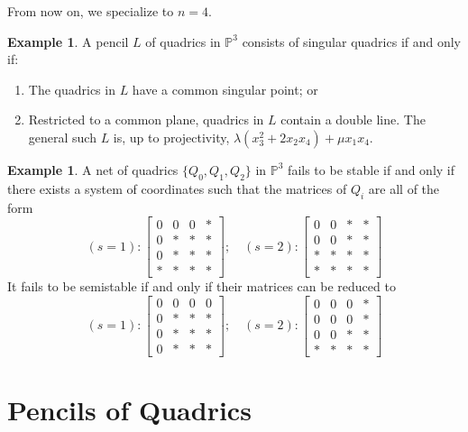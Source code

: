 \documentclass{amsart}[12pt]
\theoremstyle{definition}
\newtheorem{eg}[theorem]{Example}
\theoremstyle{remark}
\numberwithin{equation}{section}
\begin{document}
From now on, we specialize to $n = 4$. 

\begin{eg}
A pencil $L$ of quadrics in $\mathbb{P}^{3}$ consists of singular quadrics if and only if:
\begin{enumerate}
\item The quadrics in $L$ have a common singular point; or
\item Restricted to a common plane, quadrics in $L$ contain a double line. The general such $L$ is, up to projectivity, $\lambda (x_3^2 + 2x_2x_4) +  \mu x_1x_4$.
\end{enumerate}
\end{eg}


\begin{eg}
A net of quadrics $\{Q_0, Q_1, Q_2\}$ in $\mathbb{P}^3$ fails to be stable if and only if there exists a system of coordinates such that the matrices of $Q_i$ are all of the form 
\[
(s = 1): \begin{bmatrix} 0 & 0 & 0 & * \\ 0 & * & * & * \\ 0 & * & * & * \\ * & * & * & *\end{bmatrix}; \quad (s = 2): \begin{bmatrix} 0 & 0 & * & * \\ 0 & 0 & * & * \\ * & * & * & * \\ * & * & * & * \end{bmatrix}
\]
It fails to be semistable if and only if their matrices can be reduced to
\[
(s = 1): \begin{bmatrix} 0 & 0 & 0 & 0 \\ 0 & * & * & * \\ 0 & * & * & * \\ 0 & * & * & *\end{bmatrix}; \quad (s = 2): \begin{bmatrix} 0 & 0 & 0 & * \\ 0 & 0 & 0 & * \\ 0 & 0 & * & * \\ * & * & * & * \end{bmatrix}
\]
\end{eg}

\section{Pencils of Quadrics}
\end{document}
